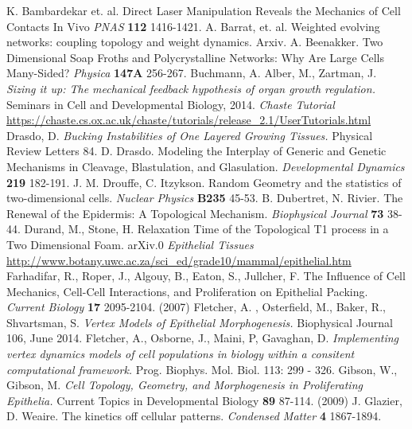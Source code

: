 \begin{thebibliography}{1}
 K. Bambardekar et. al. Direct Laser Manipulation Reveals the Mechanics of Cell Contacts In Vivo \emph{PNAS} \textbf{112} 1416-1421.
 A. Barrat, et. al. Weighted evolving networks: coupling topology and weight dynamics. Arxiv. 
 A. Beenakker. Two Dimensional Soap Froths and Polycrystalline Networks: Why Are Large Cells Many-Sided? \emph{Physica} \textbf{147A} 256-267.
 Buchmann, A. Alber, M., Zartman, J. \emph{ Sizing it up: The mechanical feedback hypothesis of organ growth regulation.} Seminars in Cell and Developmental Biology, 2014.
 \emph{Chaste Tutorial} \url{https://chaste.cs.ox.ac.uk/chaste/tutorials/release_2.1/UserTutorials.html}
 Drasdo, D. \emph{Bucking Instabilities of One Layered Growing Tissues.} Physical Review Letters 84.
 D. Drasdo. Modeling the Interplay of Generic and Genetic Mechanisms in Cleavage, Blastulation, and Glasulation. \emph{Developmental Dynamics} \textbf{219} 182-191.
 J. M. Drouffe, C. Itzykson. Random Geometry and the statistics of two-dimensional cells. \emph{Nuclear Physics} \textbf{B235} 45-53.
 B. Dubertret, N. Rivier. The Renewal of the Epidermis: A Topological Mechanism. \emph{Biophysical Journal} \textbf{73} 38-44.
 Durand, M., Stone, H. Relaxation Time of the Topological T1 process in a Two Dimensional Foam. arXiv.0
\emph{Epithelial Tissues} \url{http://www.botany.uwc.ac.za/sci_ed/grade10/mammal/epithelial.htm}
 Farhadifar, R., Roper, J., Algouy, B., Eaton, S., Jullcher, F. The Influence of Cell Mechanics, Cell-Cell Interactions, and Proliferation on Epithelial Packing. \emph{Current Biology} \textbf{17} 2095-2104. (2007) 
 Fletcher, A. , Osterfield, M., Baker, R., Shvartsman, S. \emph{Vertex Models of Epithelial Morphogenesis.} Biophysical Journal 106, June 2014.
 Fletcher, A., Osborne, J., Maini, P, Gavaghan, D. \emph{Implementing vertex dynamics models of cell populations in biology within a consitent computational framework.} Prog. Biophys. Mol. Biol. 113: 299 - 326.
 Gibson, W., Gibson, M. \emph{Cell Topology, Geometry, and Morphogenesis  in Proliferating Epithelia.} Current Topics in Developmental Biology \textbf{89} 87-114. (2009)
 J. Glazier, D. Weaire. The kinetics off cellular patterns. \emph{Condensed Matter} \textbf{4} 1867-1894.

\end{thebibliography}
